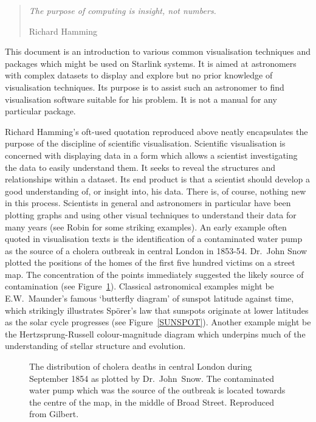 \begin{quote} 
\begin{center}
{\it The purpose of computing is insight, not numbers.} \\
\end{center}
Richard Hamming 
\end{quote}

This document is an introduction to various common visualisation 
techniques and packages which might be used on Starlink systems. It is
aimed at astronomers with complex datasets to display and explore but
no prior knowledge of visualisation techniques. Its purpose is to
assist such an astronomer to find visualisation software suitable for his
problem. It is not a manual for any particular package.

Richard Hamming's oft-used quotation reproduced above\cite{HAMMING}
neatly encapsulates the purpose of the discipline of scientific
visualisation. Scientific visualisation is concerned with displaying data
in a form which allows a scientist investigating the data to easily
understand them. It seeks to reveal the structures and relationships within
a dataset. Its end product is that a scientist should develop a good
understanding of, or insight into, his data. There is, of course, nothing
new in this process. Scientists in general and astronomers in particular
have been plotting graphs and using other visual techniques to
understand their data for many years (see Robin\cite{ROBIN} for some
striking examples). An early example often quoted in visualisation texts
is the identification of a contaminated water pump as the source of a
cholera outbreak in central London in 1853-54. Dr.~John Snow plotted the
positions of the homes of the first five hundred victims on a street map.
The concentration of the points immediately suggested the likely source of
contamination (see Figure~\ref{CHOLERA}). Classical astronomical examples
might be E.W.~Maunder's famous `butterfly diagram' of sunspot latitude
against time, which strikingly illustrates Sp\"{o}rer's law that sunspots
originate at lower latitudes as the solar cycle progresses (see 
Figure~\ref{SUNSPOT}). Another example might be the Hertzsprung-Russell
colour-magnitude diagram which underpins much of the understanding of
stellar structure and evolution.

\begin{figure}[htbp]
\begin{center}
\leavevmode
\epsfxsize=461pt
\end{center}

\caption[Cholera deaths in central London.]{The distribution of cholera
deaths in central London during September 1854 as plotted by
Dr.~John~Snow. The contaminated water pump which was the source of the
outbreak is located towards the centre of the map, in the middle of
Broad Street. Reproduced from Gilbert\cite{GILBERT}. \label{CHOLERA} }

\end{figure}

